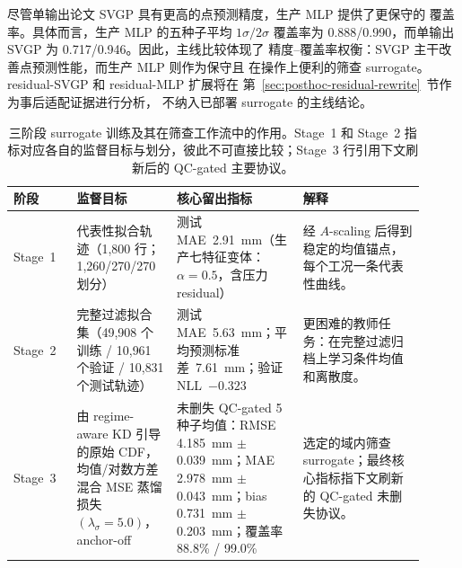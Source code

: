 尽管单输出论文 SVGP 具有更高的点预测精度，生产 MLP 提供了更保守的
覆盖率。具体而言，生产 MLP 的五种子平均 \(1\sigma/2\sigma\) 覆盖率为
0.888/0.990，而单输出 SVGP 为 0.717/0.946。因此，主线比较体现了
精度--覆盖率权衡：SVGP 主干改善点预测性能，而生产 MLP 则作为保守且
在操作上便利的筛查 surrogate。residual-SVGP 和 residual-MLP 扩展将在
第~\ref{sec:posthoc-residual-rewrite}~节作为事后适配证据进行分析，
不纳入已部署 surrogate 的主线结论。

\begin{table}[t]
\centering
\footnotesize
\setlength{\tabcolsep}{3pt}
\begin{tabular}{@{}L{0.14\linewidth}L{0.22\linewidth}L{0.28\linewidth}L{0.27\linewidth}@{}}
\toprule
阶段 & 监督目标 & 核心留出指标 & 解释 \\
\midrule
Stage~1 & 代表性拟合轨迹（1,800 行；1,260/270/270 划分） &
测试 MAE~\SI{2.91}{mm}（生产七特征变体：\(\alpha=0.5\)，含压力 residual） &
经 \(A\)-scaling 后得到稳定的均值锚点，每个工况一条代表性曲线。 \\
Stage~2 & 完整过滤拟合集（49{,}908 个训练 / 10{,}961 个验证 / 10{,}831 个测试轨迹） &
测试 MAE~\SI{5.63}{mm}；平均预测标准差~\SI{7.61}{mm}；验证 NLL~\(-0.323\) &
更困难的教师任务：在完整过滤归档上学习条件均值和离散度。 \\
Stage~3 & 由 regime-aware KD 引导的原始 CDF，均值/对数方差混合 MSE 蒸馏损失 \((\lambda_\sigma=5.0)\)，anchor-off &
未删失 QC-gated 5 种子均值：RMSE \SI{4.185}{mm} \(\pm\) \SI{0.039}{mm}；MAE \SI{2.978}{mm} \(\pm\) \SI{0.043}{mm}；bias \SI{+0.731}{mm} \(\pm\) \SI{0.203}{mm}；覆盖率 88.8\% / 99.0\% &
选定的域内筛查 surrogate；最终核心指标指下文刷新的 QC-gated 未删失协议。 \\
\bottomrule
\end{tabular}
\caption{三阶段 surrogate 训练及其在筛查工作流中的作用。Stage~1 和 Stage~2 指标对应各自的监督目标与划分，彼此不可直接比较；Stage~3 行引用下文刷新后的 QC-gated 主要协议。}
\label{tab:model-summary}
\end{table}

